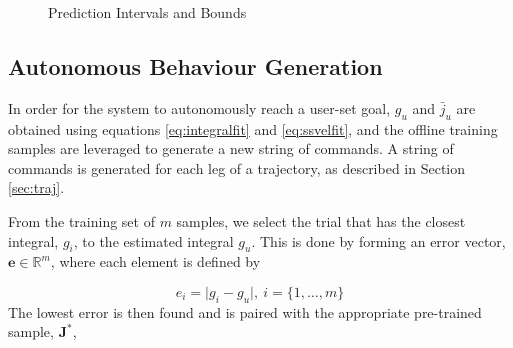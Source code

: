 \documentclass[letterpaper, 10 pt, conference]{ieeeconf}  %
\newcommand{\R}{\mathbb{R}}
\begin{document}
\begin{figure}[ht]
	\centering
	\caption{Prediction Intervals and Bounds}
	\label{fig:bounds}
\end{figure}


\subsection{Autonomous Behaviour Generation}

In order for the system to autonomously reach a user-set goal, $g_u$ and $\bar{j}_u$ are obtained using equations \eqref{eq:integralfit} and \eqref{eq:ssvelfit}, and the offline training samples are leveraged to generate a new string of commands. A string of commands is generated for each leg of a trajectory, as described in Section \ref{sec:traj}.

From the training set of $m$ samples, we select the trial that has the closest integral, $g_i$, to the estimated integral $g_u$. This is done by forming an error vector, $\mathbf{e}\in\R^{m}$, where each element is defined by

\begin{equation}
 e_i = \vert g_i-g_u \vert , ~i= \{1,\ldots,m\}
\end{equation}
 The lowest error is then found and is paired with the appropriate pre-trained sample, $\mathbf{J}^*$,
\end{document}
